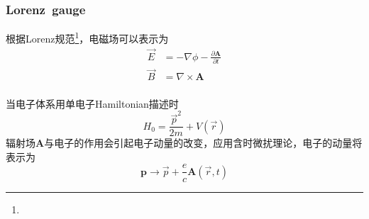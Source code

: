 \frame
{
	\frametitle{\textrm{Lorenz~gauge}}
	根据\textrm{Lorenz}规范\footnote{\fontsize{4.8pt}{4.0pt}}，电磁场可以表示为
\begin{displaymath}
\begin{aligned}
	\vec E&=-\nabla\phi-\frac{\partial\mathbf{A}}{\partial t}\\
	\vec B&=\nabla\times\mathbf{A}
  \end{aligned}%
  \label{eq:optic-26}
\end{displaymath}
{\fontsize{8.2pt}{4.0pt}}\\
当电子体系用单电子\textrm{Hamiltonian}描述时
\begin{displaymath}
	H_0=\frac{{\vec p}^2}{2m}+V(\vec r)
\end{displaymath}
辐射场$\mathbf{A}$与电子的作用会引起电子动量的改变，应用含时微扰理论，电子的动量将表示为
	\begin{displaymath}
		\mathbf{p}\rightarrow\vec p+\frac{e}{c}\mathbf{A}(\vec r,t)
	\end{displaymath}
}

